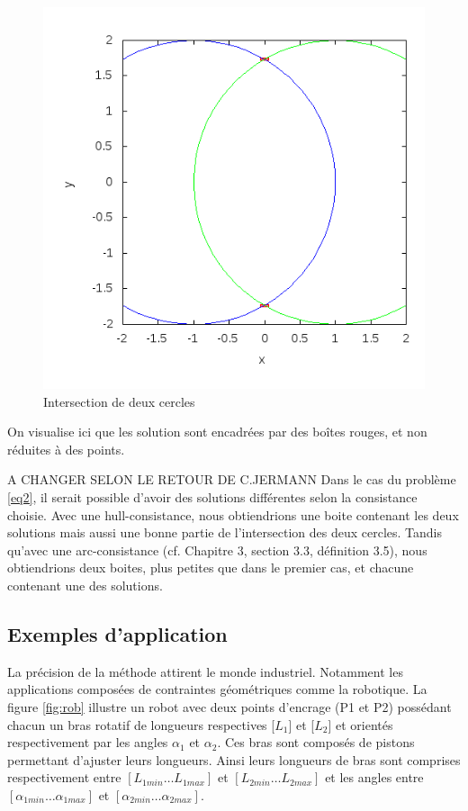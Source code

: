 \begin{figure}[ht!] %
  \center
\includegraphics[scale=0.55]{img/circle-circle}
  \caption{Intersection de deux cercles} %
 \label{fig:Deuxcerlces} %
\end{figure} %
On visualise ici que les solution sont encadrées par des \og boîtes \fg{} rouges, et non réduites à des points. 

{\color{red} A CHANGER SELON LE RETOUR DE C.JERMANN}
Dans le cas du problème \ref{eq2}, il serait possible d'avoir des solutions différentes selon la consistance choisie. Avec une hull-consistance, nous obtiendrions une boite contenant les deux solutions mais aussi une bonne partie de l'intersection des deux cercles. Tandis qu'avec une arc-consistance (cf. \cite{Goualard} Chapitre 3, section 3.3, définition 3.5), nous obtiendrions deux boites, plus petites que dans le premier cas, et chacune contenant une des solutions.


\subsection{Exemples d'application}

La précision de la méthode attirent le monde industriel. Notamment les applications composées de contraintes géométriques comme la robotique. La figure \ref{fig:rob} illustre un robot avec deux points d'encrage (P1 et P2) possédant chacun un bras rotatif de longueurs respectives [$L_1$] et [$L_2$] et orientés respectivement par les angles $\alpha_1$ et $\alpha_2$. Ces bras sont composés de pistons permettant d'ajuster leurs longueurs. Ainsi leurs longueurs de bras sont comprises respectivement entre $[L_{1min} \dots L_{1max}]$ et $[L_{2min} \dots L_{2max}]$ et les angles entre $[\alpha_{1min} \dots \alpha_{1max}]$ et $[\alpha_{2min} \dots \alpha_{2max}]$.  

